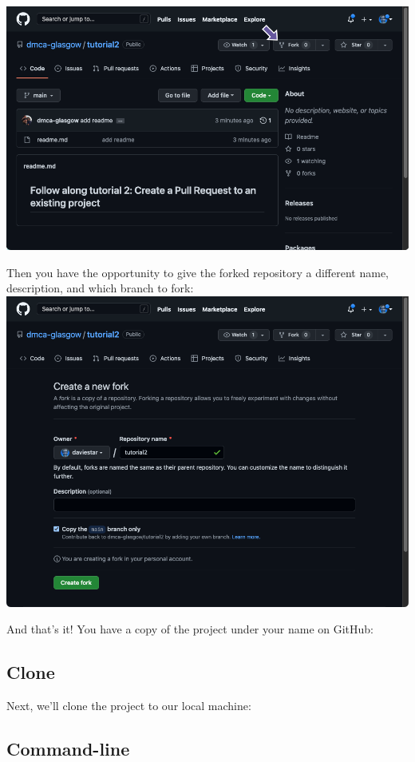 \documentclass[
  letterpaper,
  DIV=11,
  numbers=noendperiod]{scrartcl}
\begin{document}
\includegraphics{images/image77.png}

Then you have the opportunity to give the forked repository a different
name, description, and which branch to fork:
\includegraphics{images/image78.png}

And that's it! You have a copy of the project under your name on GitHub:

\subsection{Clone}\label{clone-1}

Next, we'll clone the project to our local machine:

\subsection{Command-line}
\end{document}
